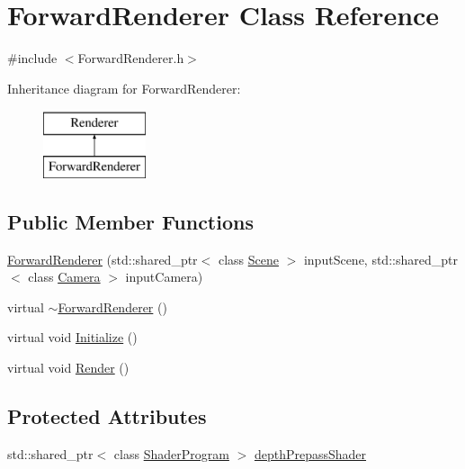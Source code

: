 \hypertarget{class_forward_renderer}{}\section{Forward\+Renderer Class Reference}
\label{class_forward_renderer}


{\ttfamily \#include $<$Forward\+Renderer.\+h$>$}

Inheritance diagram for Forward\+Renderer\+:\begin{figure}[H]
\begin{center}
\leavevmode
\includegraphics[height=2.000000cm]{class_forward_renderer}
\end{center}
\end{figure}
\subsection*{Public Member Functions}
\begin{DoxyCompactItemize}
\item 
\hyperlink{class_forward_renderer_af8ed84e45085c4dc60d565fcc3c198d1}{Forward\+Renderer} (std\+::shared\+\_\+ptr$<$ class \hyperlink{class_scene}{Scene} $>$ input\+Scene, std\+::shared\+\_\+ptr$<$ class \hyperlink{class_camera}{Camera} $>$ input\+Camera)
\item 
virtual \hyperlink{class_forward_renderer_ab27ea6139730631d79488cec3c564597}{$\sim$\+Forward\+Renderer} ()
\item 
virtual void \hyperlink{class_forward_renderer_a99c523e11a4335d061da8bdba51f1c9a}{Initialize} ()
\item 
virtual void \hyperlink{class_forward_renderer_a3693c5cd68afffc14652f24fcdc62abc}{Render} ()
\end{DoxyCompactItemize}
\subsection*{Protected Attributes}
\begin{DoxyCompactItemize}
\item 
std\+::shared\+\_\+ptr$<$ class \hyperlink{class_shader_program}{Shader\+Program} $>$ \hyperlink{class_forward_renderer_a8f703bc4c646416804bc82f4d220a648}{depth\+Prepass\+Shader}
\end{DoxyCompactItemize}


